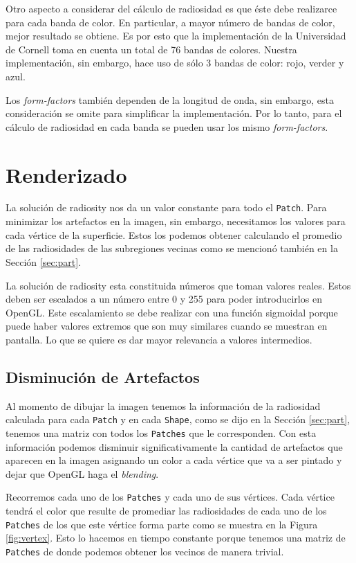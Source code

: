 \documentclass[letterpaper]{article}
\begin{document}
Otro aspecto a considerar del cálculo de radiosidad es que éste debe
realizarce para cada banda de color.  En particular, a mayor número de
bandas de color, mejor resultado se obtiene. Es por esto que la
implementación de la Universidad de Cornell toma en cuenta un total de
76 bandas de colores. Nuestra implementación, sin embargo, hace uso de
sólo 3 bandas de color: rojo, verder y azul.

Los \textsl{form-factors} también dependen de la longitud de onda, sin
embargo, esta consideración se omite para simplificar la
implementación. Por lo tanto, para el cálculo de radiosidad en cada
banda se pueden usar los mismo \textsl{form-factors}.

\section{Renderizado}
\label{sec:render}
La solución de radiosity nos da un valor constante para todo el
\texttt{Patch}. Para minimizar los artefactos en la imagen, sin
embargo, necesitamos los valores para cada vértice de la
superficie. Estos los podemos obtener calculando el promedio de las
radiosidades de las subregiones vecinas \cite{Watt92,cohen85} como se
mencionó también en la Sección \ref{sec:part}.

La solución de radiosity esta constituida números que toman valores
reales. Estos deben ser escalados a un número entre 0 y 255 para poder
introducirlos en OpenGL. Este escalamiento se debe realizar con una
función sigmoidal \cite{tumblin} porque puede haber valores extremos
que son muy similares cuando se muestran en pantalla. Lo que se quiere
es dar mayor relevancia a valores intermedios.

\subsection{Disminución de Artefactos}
\label{sec:smooth}
Al momento de dibujar la imagen tenemos la información de la
radiosidad calculada para cada \texttt{Patch} y en cada
\texttt{Shape}, como se dijo en la Sección \ref{sec:part}, tenemos una
matriz con todos los \texttt{Patches} que le corresponden. Con esta
información podemos disminuir significativamente la cantidad de
artefactos que aparecen en la imagen asignando un color a cada vértice
que va a ser pintado y dejar que OpenGL haga el \textsl{blending}.

Recorremos cada uno de los \texttt{Patches} y cada uno de sus
vértices. Cada vértice tendrá el color que resulte de promediar las
radiosidades de cada uno de los \texttt{Patches} de los que este
vértice forma parte como se muestra en la Figura
\ref{fig:vertex}. Esto lo hacemos en tiempo constante porque tenemos
una matriz de \texttt{Patches} de donde podemos obtener los vecinos de
manera trivial.
\end{document}
